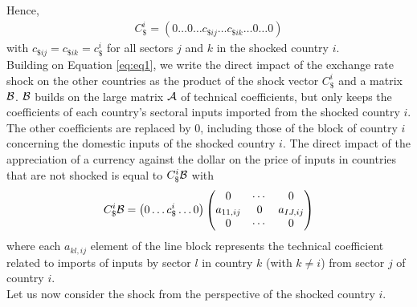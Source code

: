 \documentclass[11pt,a4paper]{article}
\begin{document}
Hence,
\begin{eqnarray*}
C_\$^i=\left(0\ldots0\ldots c_{\$ij}\ldots c_{\$ik}\dots 0\ldots0\right)
\end{eqnarray*}
with $c_{\$ij}=c_{\$ik}=c_\$^i
$
for all sectors $j$ and $k$ in the shocked country $i$.\\
Building on Equation \ref{eq:eq1}, we write the direct impact of the exchange rate shock on the other countries as the product of the shock vector $C_\$^i$ and a matrix ${\cal B}$. ${\cal B}$ builds on the large matrix ${\cal A}$ of technical coefficients, but only keeps the coefficients of each country's sectoral inputs imported from the shocked country $i$. The other coefficients are replaced by 0, including those of the block of country $i$ concerning the domestic inputs of the shocked country $i$. The direct impact of the appreciation of a currency against the dollar on the price of inputs in countries that are not shocked is equal to $C_\$^i{\cal B}$ with
\begin{eqnarray}
C_\$^i{\cal B}=\left(0\ldots c_\$^i \ldots 0\right)\left(\begin{matrix}0&\cdots&0\\a_{11,ij}&0&a_{IJ,ij}\\0&\cdots&0\\\end{matrix}\right) 	
\label{eq:eq3}
\end{eqnarray}
where each $a_{kl,ij}$ element of the line block represents the technical coefficient related to imports of inputs by sector $l$ in country $k$ (with $k\ne i$) from sector $j$ of country $i$.\\
Let us now consider the shock from the perspective of the shocked country $i$.\\
\\
\end{document}
